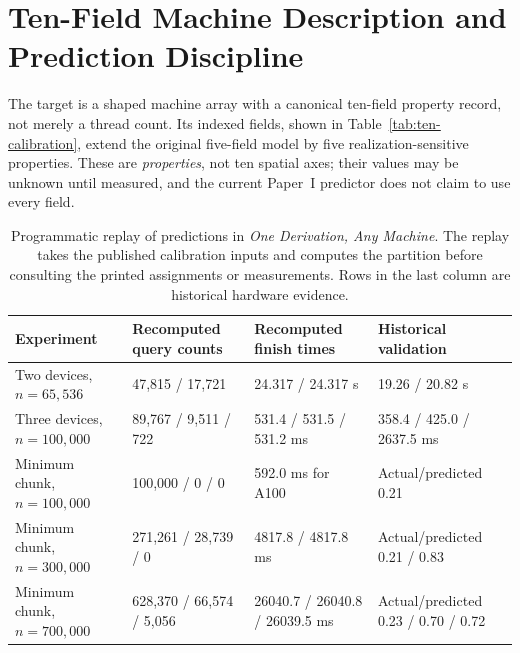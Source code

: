\documentclass[sigplan,10pt,review,balance=false,pbalance=false]{acmart}
\begin{document}
\section{Ten-Field Machine Description and Prediction Discipline}
The target is a shaped machine array with a canonical ten-field property record, not merely a thread count. Its indexed fields, shown in Table~\ref{tab:ten-calibration}, extend the original five-field model by five realization-sensitive properties. These are \emph{properties}, not ten spatial axes; their values may be unknown until measured, and the current Paper~I predictor does not claim to use every field.

\begin{table}[tp]
\centering\footnotesize
\caption{Programmatic replay of predictions in \emph{One Derivation, Any Machine}. The replay takes the published calibration inputs and computes the partition before consulting the printed assignments or measurements. Rows in the last column are historical hardware evidence.}\label{tab:prediction-validation}
\begin{tabular}{@{}p{}p{}p{}p{}@{}}\toprule
Experiment & Recomputed query counts & Recomputed finish times & Historical validation \\\midrule
Two devices, $n=65{,}536$ & 47,815 / 17,721 & 24.317 / 24.317 s & 19.26 / 20.82 s \\
Three devices, $n=100{,}000$ & 89,767 / 9,511 / 722 & 531.4 / 531.5 / 531.2 ms & 358.4 / 425.0 / 2637.5 ms \\
Minimum chunk, $n=100{,}000$ & 100,000 / 0 / 0 & 592.0 ms for A100 & Actual/predicted 0.21 \\
Minimum chunk, $n=300{,}000$ & 271,261 / 28,739 / 0 & 4817.8 / 4817.8 ms & Actual/predicted 0.21 / 0.83 \\
Minimum chunk, $n=700{,}000$ & 628,370 / 66,574 / 5,056 & 26040.7 / 26040.8 / 26039.5 ms & Actual/predicted 0.23 / 0.70 / 0.72 \\
\bottomrule\end{tabular}
\end{table}
\end{document}
